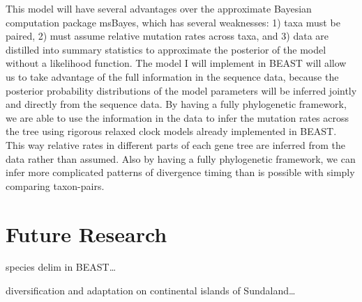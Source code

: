 \documentclass[10pt]{article}
\begin{document}
This model will have several advantages over the approximate Bayesian computation package msBayes, which has several weaknesses:
1) taxa must be paired, 
2) must assume relative mutation rates across taxa, and 
3) data are distilled into summary statistics to approximate the posterior of the model without a likelihood function.
The model I will implement in BEAST will allow us to take advantage of the full information in the sequence data, because the posterior probability distributions of the model parameters will be inferred jointly and directly from the sequence data.
By having a fully phylogenetic framework, we are able to use the information in the data to infer the mutation rates across the tree using rigorous relaxed clock models already implemented in BEAST.
This way relative rates in different parts of each gene tree are inferred from the data rather than assumed.
Also by having a fully phylogenetic framework, we can infer more complicated patterns of divergence timing than is possible with simply comparing taxon-pairs.

\section*{Future Research}
species delim in BEAST\ldots

diversification and adaptation on continental islands of Sundaland\ldots
\end{document}

